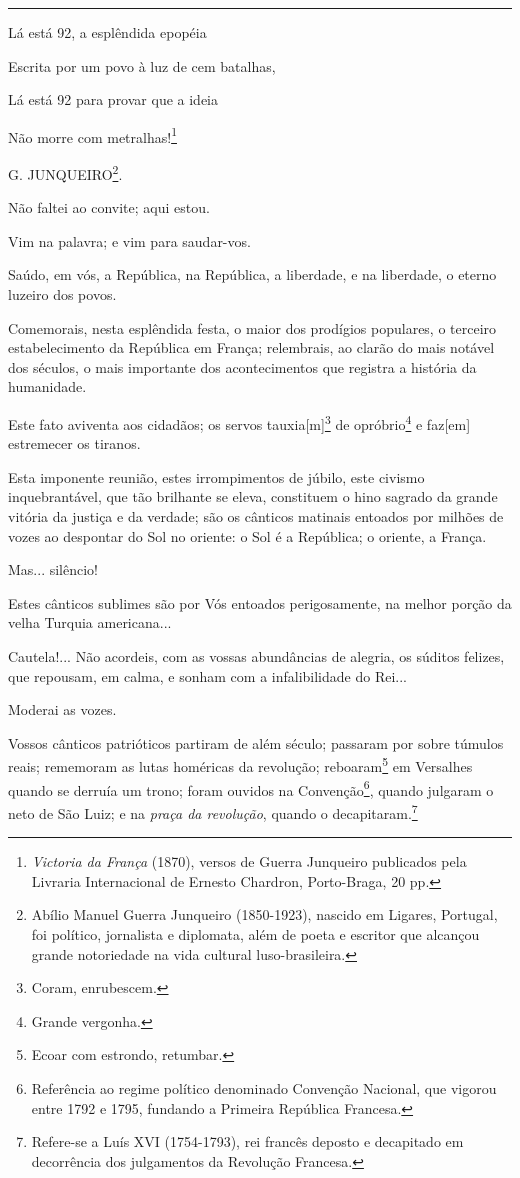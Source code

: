 \begin{center}\rule{0.5\linewidth}{\linethickness}\end{center}

Lá está 92, a esplêndida epopéia

Escrita por um povo à luz de cem batalhas,

Lá está 92 para provar que a ideia

Não morre com metralhas!\footnote{\emph{Victoria da França} (1870),
  versos de Guerra Junqueiro publicados pela Livraria Internacional de
  Ernesto Chardron, Porto-Braga, 20 pp.}

G. JUNQUEIRO\footnote{Abílio Manuel Guerra Junqueiro (1850-1923),
  nascido em Ligares, Portugal, foi político, jornalista e diplomata,
  além de poeta e escritor que alcançou grande notoriedade na vida
  cultural luso-brasileira.}.

Não faltei ao convite; aqui estou.

Vim na palavra; e vim para saudar-vos.

Saúdo, em vós, a República, na República, a liberdade, e na liberdade, o
eterno luzeiro dos povos.

Comemorais, nesta esplêndida festa, o maior dos prodígios populares, o
terceiro estabelecimento da República em França; relembrais, ao clarão
do mais notável dos séculos, o mais importante dos acontecimentos que
registra a história da humanidade.

Este fato aviventa aos cidadãos; os servos tauxia{[}m{]}\footnote{Coram,
  enrubescem.} de opróbrio\footnote{Grande vergonha.} e faz{[}em{]}
estremecer os tiranos.

Esta imponente reunião, estes irrompimentos de júbilo, este civismo
inquebrantável, que tão brilhante se eleva, constituem o hino sagrado da
grande vitória da justiça e da verdade; são os cânticos matinais
entoados por milhões de vozes ao despontar do Sol no oriente: o Sol é a
República; o oriente, a França.

Mas... silêncio!

Estes cânticos sublimes são por Vós entoados perigosamente, na melhor
porção da velha Turquia americana...

Cautela!... Não acordeis, com as vossas abundâncias de alegria, os
súditos felizes, que repousam, em calma, e sonham com a infalibilidade
do Rei...

Moderai as vozes.

Vossos cânticos patrióticos partiram de além século; passaram por sobre
túmulos reais; rememoram as lutas homéricas da revolução;
reboaram\footnote{Ecoar com estrondo, retumbar.} em Versalhes quando se
derruía um trono; foram ouvidos na Convenção\footnote{Referência ao
  regime político denominado Convenção Nacional, que vigorou entre 1792
  e 1795, fundando a Primeira República Francesa.}, quando julgaram o
neto de São Luiz; e na \emph{praça da revolução}, quando o
decapitaram.\footnote{Refere-se a Luís XVI (1754-1793), rei francês
  deposto e decapitado em decorrência dos julgamentos da Revolução
  Francesa.}

